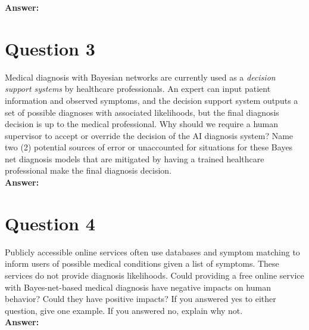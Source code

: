 \documentclass[12pt]{article}
\begin{document}
\noindent\textbf{Answer:}

\newpage

\section*{Question 3}
Medical diagnosis with Bayesian networks are currently used as
a \textit{decision support systems} by healthcare professionals. An expert can 
input patient information and observed symptoms, and the decision support system 
outputs a set of possible diagnoses with associated likelihoods, but the final 
diagnosis decision is up to the medical professional. Why should we require a human
supervisor to accept or override the decision of the AI diagnosis system? Name two 
(2) potential sources of error or unaccounted for situations for these Bayes net 
diagnosis models that are mitigated by having a trained healthcare professional 
make the final diagnosis decision. \\

\noindent\textbf{Answer:}

\newpage

\section*{Question 4} Publicly accessible online services often use databases and 
symptom matching to inform users of possible medical conditions given a list of 
symptoms. These services do not provide diagnosis likelihoods. Could providing a 
free online service with Bayes-net-based medical diagnosis have negative impacts on
human behavior? Could they have positive impacts? If you answered yes to either 
question, give one example. If you answered no, explain why not. \\

\noindent\textbf{Answer:}
\end{document}

